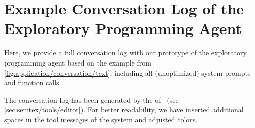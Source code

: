 
\chapter{Example Conversation Log of the Exploratory Programming Agent}
\label{apx:conversation}

Here, we provide a full conversation log with our prototype of the exploratory programming agent based on the example from \cref{fig:application/conversation/text}, including all (unoptimized) system prompts and function calls.

The conversation log has been generated by the  of \semtex~(see \cref{sec:semtex/tools/editor}).
For better readability, we have inserted additional spaces in the tool messages of the system and adjusted colors.

\begin{raggedright}
\textsf{%
%
}
\end{raggedright}
